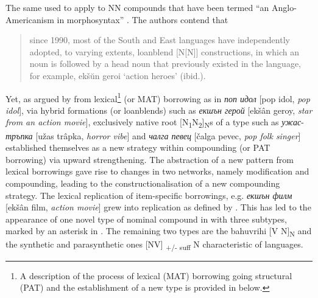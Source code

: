\documentclass[output=paper]{LSP/langsci}
\begin{document}
The same used to apply to NN  compounds that have been termed “an Anglo-Americanism in  morphosyntax”  \citep[277]{Vakareliyska2014}. The authors contend that 

\begin{quotation}
since 1990, most of the South and East  languages have independently adopted, to varying extents,  loanblend [N[N]] constructions, in which an   noun is followed by a head noun that previously existed in the language, for example,  ekšŭn geroi  ‘action heroes’ (ibid.). 
\end{quotation}

Yet, as argued by \citet{Bagasheva2016}  from lexical\footnote{A description of the process of lexical (MAT) borrowing going structural (PAT) and the establishment of a new  type is provided in  below.}  (or MAT) borrowing as in \textit{{поп идол}} [pop idol, \textit{pop idol}], via hybrid formations (or loanblends) such as \textit{{екшън герой}} [ekšân geroy, \textit{star from an action movie}], exclusively native root [N\textsubscript{1}N\textsubscript{2}]\textsubscript{N}s of a  type such as \textit{{ужас}}-\textit{{тръпка}} [užas trâpka, \textit{horror vibe}] and \textit{{чалга певец} }[čalga pevec, \textit{pop folk singer}] established themselves as a new strategy within compounding (or PAT borrowing) via upward strengthening. The abstraction of a new pattern from lexical borrowings gave rise to  changes in two networks, namely modification and compounding, leading to the constructionalisation of a new compounding strategy. The lexical replication of item-specific borrowings, e.g. \textit{{екшън филм} }[ekšân film, \textit{action movie}] grew into  replication as defined by \citet[49]{Heine2006}. This has led to the appearance of one novel type of nominal compound in  with three subtypes, marked by an asterisk in . The remaining two types are the bahuvrihi [V N]\textsubscript{N} and the synthetic and parasynthetic ones [NV] \textsubscript{+/- suff} N characteristic of  languages.
\end{document}
